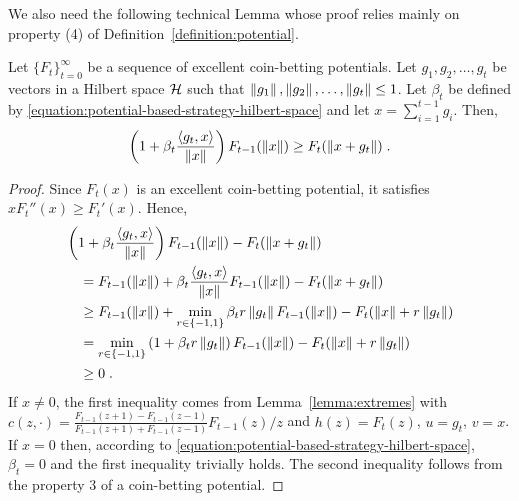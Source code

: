 We also need the following technical Lemma whose proof relies mainly on
property (4) of Definition~\ref{definition:potential}.
\begin{lemma}
\label{lemma:recursion_hilbert}
Let $\{F_t\}_{t=0}^\infty$ be a sequence of excellent coin-betting potentials.
Let $g_1, g_2, \dots, g_t$ be vectors in a Hilbert space $\mathcal{H}$ such that
$\left\|{g_1}\right\|, \left\|{g_2}\right\|, \dots, \left\|{g_t}\right\| \le 1$. Let $\beta_t$
be defined by \eqref{equation:potential-based-strategy-hilbert-space}
and let $x = \sum_{i=1}^{t-1} g_i$. Then,
$$
\left(1 + \beta_t \frac{\langle g_t, x \rangle}{\left\|{x}\right\|} \right) F_{t-1}(\left\|{x}\right\|)
\ge F_t(\left\|{x + g_t}\right\|) \; .
$$
\end{lemma}
%
\begin{proof}
Since $F_t(x)$ is an excellent coin-betting potential, it satisfies $x
F_t''(x) \ge F_t'(x)$. Hence,
\begin{align*}
&\left(1 + \beta_t \frac{\langle g_t, x \rangle}{\left\|{x}\right\|} \right) F_{t-1}(\left\|{x}\right\|) - F_t(\left\|{x + g_t}\right\|) \\
&\quad = F_{t-1}(\left\|{x}\right\|) + \beta_t \frac{\langle g_t, x \rangle}{\left\|{x}\right\|} F_{t-1}(\left\|{x}\right\|) - F_t(\left\|{x + g_t}\right\|) \\
&\quad \ge F_{t-1}(\left\|{x}\right\|)+\min_{r \in \{-1,1\}} \beta_t r \left\|{g_t}\right\| F_{t-1}(\left\|{x}\right\|) - F_t(\left\|{x}\right\| + r \left\|{g_t}\right\|) \\
&\quad =\min_{r \in \{-1,1\}} \left(1 + \beta_t r \left\|{g_t}\right\|\right) F_{t-1}(\left\|{x}\right\|) - F_t(\left\|{x}\right\| + r \left\|{g_t}\right\|) \\
&\quad \ge 0 \; .
\end{align*}
If $x \neq 0$, the first inequality comes from Lemma~\ref{lemma:extremes} with
$c(z,\cdot) = \frac{F_{t-1}(z+1) - F_{t-1}(z-1)}{F_{t-1}(z+1) + F_{t-1}(z-1)} F_{t-1}(z) / z$ and
$h(z) = F_t(z)$, $u=g_t$, $v=x$.
If $x=0$ then, according to
\eqref{equation:potential-based-strategy-hilbert-space}, $\beta_t = 0$ and the
first inequality trivially holds. The second inequality follows from the
property 3 of a coin-betting potential.
\end{proof}


